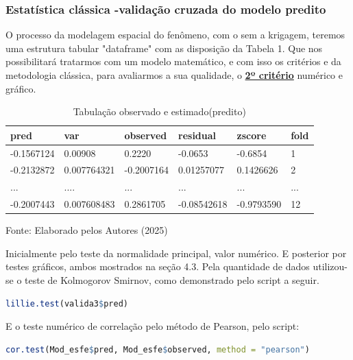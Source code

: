  \subsubsection{Estatística clássica -validação cruzada do modelo predito }
 
 \hspace*{1.25 cm} O processo da modelagem espacial do fenômeno, com o sem a krigagem, teremos uma estrutura tabular "dataframe" com as disposição da Tabela 1. Que nos possibilitará tratarmos com um modelo matemático, e  com isso os critérios e da metodologia clássica, para avaliarmos a sua qualidade, o \textbf{\underline{2º critério}} numérico e gráfico.
 \begin{table}[h!t]
 	\centering
 	\begin{threeparttable}
 		\caption{Tabulação observado e estimado(predito)  }
 		\label{Tabela-entrada-avalia5do}
 		\begin{tabular}{ l l l l ll}
 			\toprule
pred&	var&	observed&	residual&	zscore&	fold	 \\\midrule
-0.1567124&0.00908&0.2220&-0.0653&-0.6854&	1 	 \\ 
-0.2132872&	0.007764321	&-0.2007164	&	0.01257077&	0.1426626&	2 \\ 
...&	....&	...&	...&...&... \\ 
-0.2007443	&0.007608483&	0.2861705&	-0.08542618&-0.9793590	&12 \\ 
\bottomrule
 		\end{tabular}%
 		\begin{tablenotes}
 			\item [{\normalsize Fonte:     Elaborado pelos Autores (2025)}]  
 		\end{tablenotes}
 	\end{threeparttable}
 \end{table}
\hspace*{1.25 cm} Inicialmente  pelo teste da normalidade principal, valor numérico. E posterior por testes gráficos, ambos mostrados na seção 4.3. Pela quantidade de dados utilizou-se o teste de Kolmogorov Smirnov, como demonstrado pelo script a seguir.
 
 \lstset{
 	language=R, %
 	caption= Teste Lilliefors (Kolmogorov\_Smirnov)em linguagem R,} %
 \begin{lstlisting}[language=R]
 	lillie.test(valida3$pred)
 \end{lstlisting}  
 \hspace*{1.25 cm}  E o teste numérico de correlação pelo método de Pearson, pelo script:
 \lstset{
 	language=R, %
 	caption= Teste de correlação em linguagem R,} %
 \begin{lstlisting}[language=R]
 	cor.test(Mod_esfe$pred, Mod_esfe$observed, method = "pearson")
 \end{lstlisting} 
 
